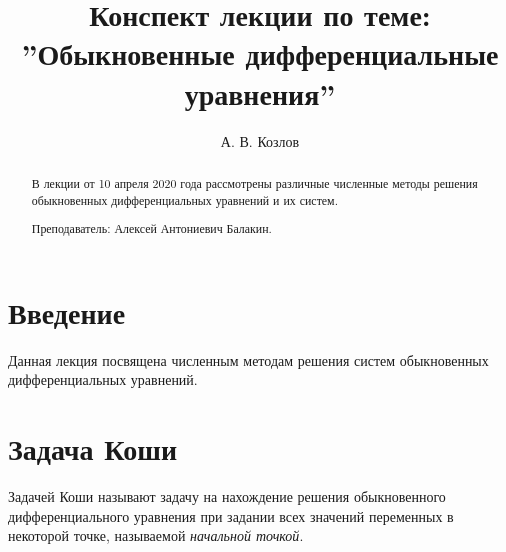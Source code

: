 \documentclass[a4paper,9pt,russian]{article}
\title{Конспект лекции по теме: ''Обыкновенные дифференциальные уравнения''}
\author{А. В. Козлов}
\begin{document}
\maketitle
\begin{abstract}
    В лекции от 10 апреля 2020 года рассмотрены различные численные методы решения обыкновенных дифференциальных уравнений и их систем. 
    \par Преподаватель: {\sc Алексей Антониевич Балакин}.
\end{abstract}
\tableofcontents
\newpage
\section{Введение}
     Данная лекция посвящена численным методам решения систем обыкновенных дифференциальных уравнений.
\section{Задача Коши}
    Задачей Коши называют задачу на нахождение решения обыкновенного дифференциального уравнения при задании всех значений переменных в некоторой точке, называемой {\it начальной точкой}.
\end{document}
